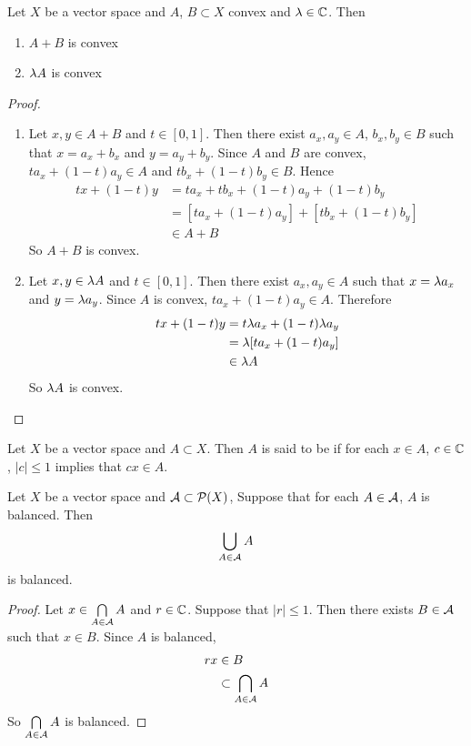 \documentclass{book}
\begin{document}
	\begin{ex}
		Let $X$ be a vector space and $A$, $B \subset X$ convex and $\lambda \in \mathbb{C}$. Then 
		\begin{enumerate}
			\item $A + B$ is convex
			\item $\lambda A$ is convex
		\end{enumerate}
	\end{ex}
	
	\begin{proof}\
		\begin{enumerate}
			\item Let $x,y \in A + B$ and $t \in [0,1]$. Then there exist $a_x, a_y \in A$, $b_x, b_y \in B$ such that $x = a_x + b_x$ and $y = a_y + b_y$. Since $A$ and $B$ are convex, $ta_x + (1-t)a_y \in A$ and $tb_x + (1-t)b_y \in B$. Hence 
			\begin{align*}
				tx + (1-t)y
				&= ta_x + tb_x + (1-t)a_y + (1-t)b_y \\
				&= [ta_x + (1-t)a_y] + [tb_x + (1-t)b_y] \\
				& \in A + B
			\end{align*}
			So $A + B$ is convex.
			\item Let $x, y \in \lambda A$ and $t \in [0,1]$. Then there exist $a_x, a_y \in A$ such that $x = \lambda a_x$ and $y = \lambda a_y$. Since $A$ is convex, $t a_x + (1-t) a_y \in A$. Therefore 
			\begin{align*}
				tx + (1-t)y 
				&= t \lambda a_x + (1-t) \lambda a_y \\
				&= \lambda [t a_x + (1-t) a_y ] \\
				& \in \lambda A
			\end{align*}
			So $\lambda A$ is convex.
		\end{enumerate}
	\end{proof}

		\begin{defn}
		Let $X$ be a vector space and $A \subset X$. Then $A$ is said to be  if for each $x \in A$, $c \in \mathbb{C}$, $|c| \leq 1$ implies that $cx \in A$.
	\end{defn}

		\begin{ex}
		Let $X$ be a vector space and $\mathcal{A} \subset \mathcal{P}(X)$, Suppose that for each $A \in \mathcal{A}$, $A$ is balanced. Then $$\bigcup_{A \in \mathcal{A}} A$$ is balanced.
	\end{ex}
	
	\begin{proof}
		Let $x \in \bigcap\limits_{A \in \mathcal{A}} A$ and $r \in \mathbb{C}$. Suppose that $|r| \leq 1$. Then there exists $B \in \mathcal{A}$ such that $x \in B$. Since $A$ is balanced, 
		\begin{align*}
			rx 
			&\in B \\
			& \subset \bigcap\limits_{A \in \mathcal{A}} A
		\end{align*}
		So $\bigcap\limits_{A \in \mathcal{A}} A$ is balanced.
	\end{proof}
\end{document}
